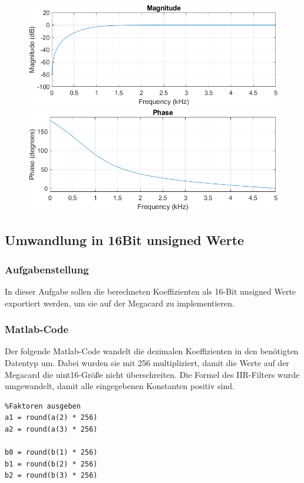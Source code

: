 \documentclass{article}
\begin{document}
\begin{figure}[h]
    \centering
    \includegraphics[width=0.7\linewidth]{img/Bode_02.png}
    \includegraphics[width=0.7\linewidth]{img/Bode_03.png}
\end{figure}
\newpage
\subsection{Umwandlung in 16Bit unsigned Werte}
\subsubsection{Aufgabenstellung}
In dieser Aufgabe sollen die berechneten Koeffizienten als 16-Bit unsigned Werte exportiert werden, um sie auf der Megacard zu implementieren.

\subsubsection{Matlab-Code}
Der folgende Matlab-Code wandelt die dezimalen Koeffizienten in den benötigten Datentyp um. Dabei wurden sie mit 256 multipliziert, damit die Werte auf der Megacard die uint16-Größe nicht überschreiten. Die Formel des IIR-Filters wurde umgewandelt, damit alle eingegebenen Konstanten positiv sind.

\begin{verbatim}
%Faktoren ausgeben
a1 = round(a(2) * 256)
a2 = round(a(3) * 256)

b0 = round(b(1) * 256)
b1 = round(b(2) * 256)
b2 = round(b(3) * 256)
\end{verbatim}
\end{document}
